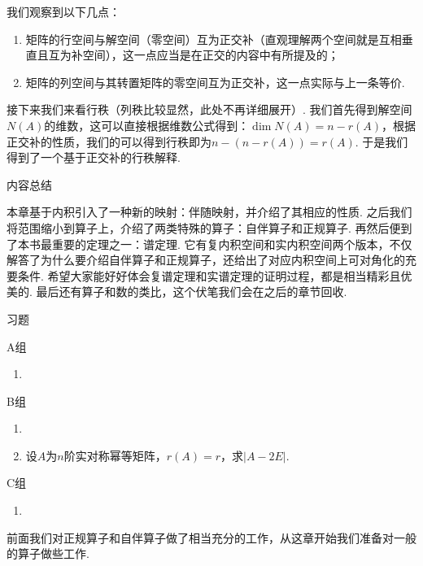 我们观察到以下几点：
\begin{enumerate}
    \item 矩阵的行空间与解空间（零空间）互为正交补（直观理解两个空间就是互相垂直且互为补空间），这一点应当是在正交的内容中有所提及的；

    \item 矩阵的列空间与其转置矩阵的零空间互为正交补，这一点实际与上一条等价.
\end{enumerate}

接下来我们来看行秩（列秩比较显然，此处不再详细展开）. 我们首先得到解空间$N(A)$的维数，这可以直接根据维数公式得到：$\dim N(A) = n-r(A)$，根据正交补的性质，我们的可以得到行秩即为$n-(n-r(A))=r(A)$. 于是我们得到了一个基于正交补的行秩解释.

\vspace{2ex}
\centerline{\heiti \Large 内容总结}

本章基于内积引入了一种新的映射：伴随映射，并介绍了其相应的性质. 之后我们将范围缩小到算子上，介绍了两类特殊的算子：自伴算子和正规算子. 再然后便到了本书最重要的定理之一：谱定理. 它有复内积空间和实内积空间两个版本，不仅解答了为什么要介绍自伴算子和正规算子，还给出了对应内积空间上可对角化的充要条件. 希望大家能好好体会复谱定理和实谱定理的证明过程，都是相当精彩且优美的. 最后还有算子和数的类比，这个伏笔我们会在之后的章节回收.

\vspace{2ex}
\centerline{\heiti \Large 习题}

\vspace{2ex}
{\kaishu }
\begin{flushright}
    \kaishu

\end{flushright}

\centerline{\heiti A组}
\begin{enumerate}
    \item
\end{enumerate}

\centerline{\heiti B组}
\begin{enumerate}
    \item \item 设$A$为$n$阶实对称幂等矩阵，$r(A)=r$，求$|A-2E|$.
\end{enumerate}

\centerline{\heiti C组}
\begin{enumerate}
    \item
\end{enumerate}

前面我们对正规算子和自伴算子做了相当充分的工作，从这章开始我们准备对一般的算子做些工作.

